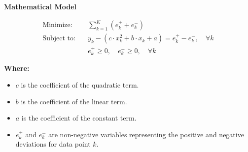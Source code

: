 \documentclass{article}
\begin{document}
\textbf{Mathematical Model}

\begin{align*}
\text{Minimize:} \quad & \sum_{k=1}^{K} (e_k^+ + e_k^-) \\
\text{Subject to:} \quad & y_k - (c \cdot x_k^2 + b \cdot x_k + a) = e_k^+ - e_k^-, \quad \forall k \\
& e_k^+ \geq 0, \quad e_k^- \geq 0, \quad \forall k
\end{align*}

\textbf{Where:}
\begin{itemize}
    \item \( c \) is the coefficient of the quadratic term.
    \item \( b \) is the coefficient of the linear term.
    \item \( a \) is the coefficient of the constant term.
    \item \( e_k^+ \) and \( e_k^- \) are non-negative variables representing the positive and negative deviations for data point \( k \).
\end{itemize}
\end{document}
